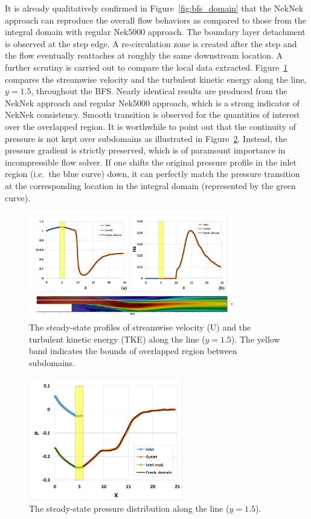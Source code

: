 It is already qualitatively confirmed in Figure~\ref{fig:bfs_domain} that the NekNek approach can reproduce the overall flow behaviors as compared to those from the integral domain with regular Nek5000 approach.
The boundary layer detachment is observed at the step edge.
A re-circulation zone is created after the step and the flow eventually reattaches at roughly the same downstream location.
A further scrutiny is carried out to compare the local data extracted.
Figure~\ref{fig:bfs_results} compares the streamwise velocity and the turbulent kinetic energy along the line, $y=1.5$, throughout the BFS.
Nearly identical results are produced from the NekNek approach and regular Nek5000 approach, which is a strong indicator of NekNek consistency.
Smooth transition is observed for the quantities of interest over the overlapped region.
It is worthwhile to point out that the continuity of pressure is not kept over subdomains as illustrated in Figure~\ref{fig:bfs_pressure}.
Instead, the pressure gradient is strictly preserved, which is of paramount importance in incompressible flow solver.
If one shifts the original pressure profile in the inlet region (i.e.\ the blue curve) down, it can perfectly match the pressure transition at the corresponding location in the integral domain (represented by the green curve).

\begin{figure}[!ht]
\centering
\includegraphics[width=0.8\textwidth]{./figures/bfs_neknek_results.png}
\caption{The steady-state profiles of streamwise velocity (U) and the turbulent kinetic energy (TKE) along the line ($y=1.5$). The yellow band indicates the bounds of overlapped region between subdomains. }
\label{fig:bfs_results}
\end{figure}

\begin{figure}[!ht]
\centering
\includegraphics[width=0.6\textwidth]{./figures/bfs_neknek_pressure.png}
\caption{The steady-state pressure distribution along the line ($y=1.5$). }
\label{fig:bfs_pressure}
\end{figure}

